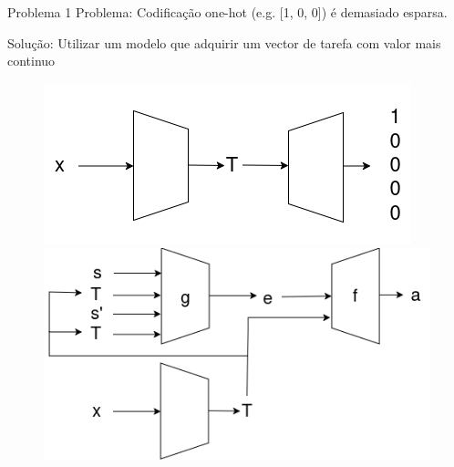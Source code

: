 \begin{frame}{Problema 1}
    Problema: Codificação one-hot (e.g. [1, 0, 0]) é demasiado esparsa.

    Solução: Utilizar um modelo que adquirir um vector de tarefa com valor mais continuo 

    \begin{figure}
        \begin{minipage}[t]{0.45\linewidth}
            \centering
            \vspace{0pt}
            \includegraphics[width=\textwidth]{img/task_encoder.png}
        \end{minipage}
        \hspace{0.5cm}
        \begin{minipage}[t]{0.45\linewidth}
            \centering
            \vspace{0pt}
            \includegraphics[width=\textwidth]{img/sacaar_encoded.png}
        \end{minipage}
    \end{figure}
\end{frame}
